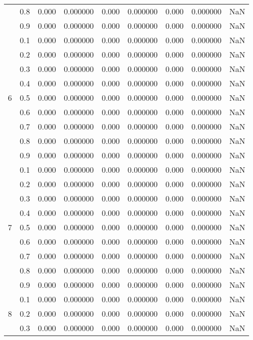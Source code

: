 \begin{longtable}{ | c | c || c | c | c | c | c | c | c | }
 & 0.8 & 0.000 & 0.000000 & 0.000 & 0.000000 & 0.000 & 0.000000 & NaN \\
 & 0.9 & 0.000 & 0.000000 & 0.000 & 0.000000 & 0.000 & 0.000000 & NaN \\
 \hline
\multirow{9}{*}{6} & 0.1 & 0.000 & 0.000000 & 0.000 & 0.000000 & 0.000 & 0.000000 & NaN \\
 & 0.2 & 0.000 & 0.000000 & 0.000 & 0.000000 & 0.000 & 0.000000 & NaN \\
 & 0.3 & 0.000 & 0.000000 & 0.000 & 0.000000 & 0.000 & 0.000000 & NaN \\
 & 0.4 & 0.000 & 0.000000 & 0.000 & 0.000000 & 0.000 & 0.000000 & NaN \\
 & 0.5 & 0.000 & 0.000000 & 0.000 & 0.000000 & 0.000 & 0.000000 & NaN \\
 & 0.6 & 0.000 & 0.000000 & 0.000 & 0.000000 & 0.000 & 0.000000 & NaN \\
 & 0.7 & 0.000 & 0.000000 & 0.000 & 0.000000 & 0.000 & 0.000000 & NaN \\
 & 0.8 & 0.000 & 0.000000 & 0.000 & 0.000000 & 0.000 & 0.000000 & NaN \\
 & 0.9 & 0.000 & 0.000000 & 0.000 & 0.000000 & 0.000 & 0.000000 & NaN \\
 \hline
\multirow{9}{*}{7} & 0.1 & 0.000 & 0.000000 & 0.000 & 0.000000 & 0.000 & 0.000000 & NaN \\
 & 0.2 & 0.000 & 0.000000 & 0.000 & 0.000000 & 0.000 & 0.000000 & NaN \\
 & 0.3 & 0.000 & 0.000000 & 0.000 & 0.000000 & 0.000 & 0.000000 & NaN \\
 & 0.4 & 0.000 & 0.000000 & 0.000 & 0.000000 & 0.000 & 0.000000 & NaN \\
 & 0.5 & 0.000 & 0.000000 & 0.000 & 0.000000 & 0.000 & 0.000000 & NaN \\
 & 0.6 & 0.000 & 0.000000 & 0.000 & 0.000000 & 0.000 & 0.000000 & NaN \\
 & 0.7 & 0.000 & 0.000000 & 0.000 & 0.000000 & 0.000 & 0.000000 & NaN \\
 & 0.8 & 0.000 & 0.000000 & 0.000 & 0.000000 & 0.000 & 0.000000 & NaN \\
 & 0.9 & 0.000 & 0.000000 & 0.000 & 0.000000 & 0.000 & 0.000000 & NaN \\
 \hline
\multirow{9}{*}{8} & 0.1 & 0.000 & 0.000000 & 0.000 & 0.000000 & 0.000 & 0.000000 & NaN \\
 & 0.2 & 0.000 & 0.000000 & 0.000 & 0.000000 & 0.000 & 0.000000 & NaN \\
 & 0.3 & 0.000 & 0.000000 & 0.000 & 0.000000 & 0.000 & 0.000000 & NaN \\

\end{longtable}
